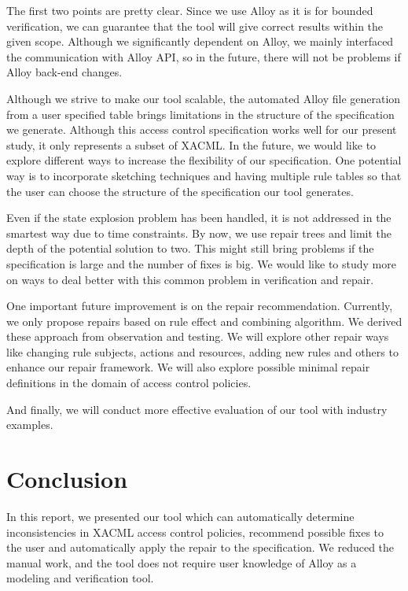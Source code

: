 \documentclass[letterpaper]{acm_proc_article-sp}
\begin{document}
The first two points are pretty clear. Since we use Alloy as it is for bounded verification, we can guarantee that the tool will give correct results within the given scope. Although we significantly dependent on Alloy, we mainly interfaced the communication with Alloy API, so in the future, there will not be problems if Alloy back-end changes.

Although we strive to make our tool scalable, the automated Alloy file generation from a user specified table brings limitations in the structure of the specification we generate. Although this access control specification works well for our present study, it only represents a subset of XACML. In the future, we would like to explore different ways to increase the flexibility of our specification. One potential way is to incorporate sketching techniques and having multiple rule tables so that the user can choose the structure of the specification our tool generates.

Even if the state explosion problem has been handled, it is not addressed in the smartest way due to time constraints. By now, we use repair trees and limit the depth of the potential solution to two. This might still bring problems if the specification is large and the number of fixes is big. We would like to study more on ways to deal better with this common problem in verification and repair.

One important future improvement is on the repair recommendation. Currently, we only propose repairs based on rule effect and combining algorithm. We derived these approach from observation and testing. We will explore other repair ways like changing rule subjects, actions and resources, adding new rules and others to enhance our repair framework. We will also explore possible minimal repair definitions in the domain of access control policies.

And finally, we will conduct more effective evaluation of our tool with industry examples.

\section{Conclusion}

In this report, we presented our tool which can automatically determine inconsistencies in XACML access control policies, recommend possible fixes to the user and automatically apply the repair to the specification. We reduced the manual work, and the tool does not require user knowledge of Alloy as a modeling and verification tool.
\end{document}
